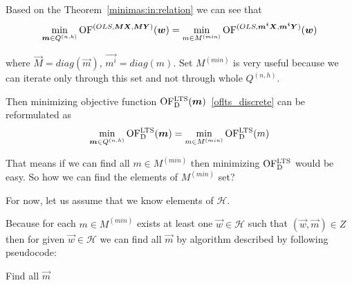 Based on the Theorem~\ref{minimas:in:relation} we can see that
\begin{equation}
    \operatorname*{min}_{\boldsymbol{m} \in Q^{(n,h)}} \operatorname{OF}^{(OLS,\boldsymbol{M}\boldsymbol{X}, \boldsymbol{M}\boldsymbol{Y})} (\boldsymbol{w}) =
    \operatorname*{min}_{m \in M^{(min)}} \operatorname{OF}^{(OLS,\boldsymbol{m^i}\boldsymbol{X}, \boldsymbol{m^i}\boldsymbol{Y})} (\boldsymbol{w})
\end{equation}

where $\vec{M} = diag(\vec{m})$, $\vec{m^i} = diag(m)$. Set $M^{(min)}$ is very useful because we can iterate only through this set and not through whole $Q^{(n,h)}$.

Then minimizing objective function $\operatorname{OF^{LTS}_D}(\boldsymbol{m})$~\eqref{oflts_discrete} can be reformulated as 
\begin{equation} \label{mminqnh}
    \operatorname*{min}_{\boldsymbol{m} \in Q^{(n,h)}}  \operatorname{OF^{LTS}_D}(\boldsymbol{m}) = \operatorname*{min}_{m \in M^{(min)}} \operatorname{OF^{LTS}_D}(m)
\end{equation}


That means if we can find all $m \in M^{(min)}$ then minimizing $\operatorname{OF^{LTS}_D}$ would be easy.
So how we can find the elements of $M^{(min)}$ set? 

For now, let us assume that we know elements of $\mathcal{H}$.

Because for each $m \in M^{(min)}$ exists at least one $\vec{w} \in \mathcal{H}$ such that $(\vec{w}, \vec{m}) \in Z$ then for given $\vec{w} \in \mathcal{H}$ we can find all $\vec{m}$ by algorithm described by following pseudocode:

\begin{algorithm}[H]
    \label{find:all:m}

      \caption{Find all $\vec{m}$}


      

    \;
\end{algorithm}


